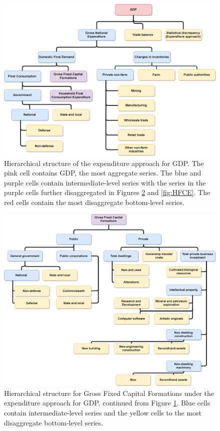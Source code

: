 \documentclass[graybox]{svmult}
\begin{document}
\begin{figure}[H]
	\centering	\includegraphics[width=\textwidth]{Figs/ExpenditureApproach.PNG}
	\caption{Hierarchical structure of the expenditure approach for GDP. The pink cell contains GDP, the most aggregate series. The blue and purple cells contain intermediate-level series with the series in the purple cells further disaggregated in Figures \ref{fig:GFCF} and \ref{fig:HFCE}. The red cells contain the most disaggregate bottom-level series.}\label{fig:GDP_E}
\end{figure}

\begin{figure}[H]
	\centering
	\includegraphics[width=\textwidth]{Figs/GFCF.PNG}
	\caption{Hierarchical structure for Gross Fixed Capital Formations under the expenditure approach for GDP, continued from Figure \ref{fig:GDP_E}. Blue cells contain intermediate-level series and the yellow cells to the most disaggregate bottom-level series.}\label{fig:GFCF}
\end{figure}
\end{document}
